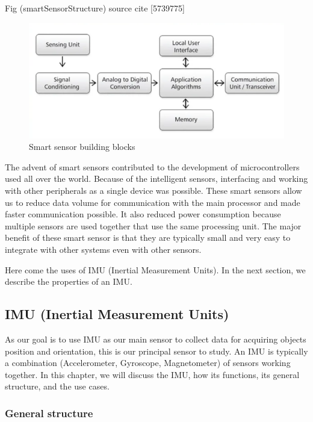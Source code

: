 Fig (smartSensorStructure) source cite [5739775]
\begin{figure}[h]
  \centering
    \includegraphics[width=\linewidth]{figures/smartSensorStructure.png}
    \caption{ Smart sensor building blocks }
\label{fig:smartSensorStructure}
\end{figure}


The advent of smart sensors contributed to the development of microcontrollers used all over the world. Because of the intelligent sensors, interfacing and working with other peripherals as a single device was possible.
These smart sensors allow us to reduce data volume for communication with the main processor and made faster communication possible. It also reduced power consumption because multiple sensors are used together that use the same processing unit. The major benefit of these smart sensor is that they are typically small and very easy to integrate with other systems even with other sensors.

Here come the uses of IMU (Inertial Measurement Units). In the next section, we describe the properties of an IMU.


\subsection{IMU (Inertial Measurement Units)}
As our goal is to use IMU as our main sensor to collect data for acquiring objects position and orientation, this is our principal sensor to study. An IMU is typically a combination (Accelerometer, Gyroscope, Magnetometer) of sensors working together.
In this chapter, we will discuss the IMU, how its functions, its general structure, and the use cases.

\subsubsection{General structure}

